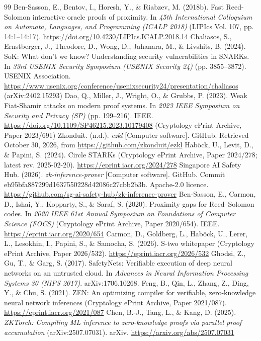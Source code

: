\documentclass[11pt]{article}
\begin{document}
\begin{thebibliography}{99}
 Ben-Sasson, E., Bentov, I., Horesh, Y., \& Riabzev, M. (2018b). Fast Reed-Solomon interactive oracle proofs of proximity. In \emph{45th International Colloquium on Automata, Languages, and Programming (ICALP 2018)} (LIPIcs Vol. 107, pp. 14:1--14:17). \url{https://doi.org/10.4230/LIPIcs.ICALP.2018.14}
 Chaliasos, S., Ernstberger, J., Theodore, D., Wong, D., Jahanara, M., \& Livshits, B. (2024). SoK: What don't we know? Understanding security vulnerabilities in SNARKs. In \emph{33rd USENIX Security Symposium (USENIX Security 24)} (pp. 3855--3872). USENIX Association. \url{https://www.usenix.org/conference/usenixsecurity24/presentation/chaliasos} (arXiv:2402.15293)
 Dao, Q., Miller, J., Wright, O., \& Grubbs, P. (2023). Weak Fiat-Shamir attacks on modern proof systems. In \emph{2023 IEEE Symposium on Security and Privacy (SP)} (pp. 199--216). IEEE. \url{https://doi.org/10.1109/SP46215.2023.10179408} (Cryptology ePrint Archive, Paper 2023/691)
 Zkonduit. (n.d.). \emph{ezkl} [Computer software]. GitHub. Retrieved October 30, 2026, from \url{https://github.com/zkonduit/ezkl}
 Hab\"{o}ck, U., Levit, D., \& Papini, S. (2024). Circle STARKs (Cryptology ePrint Archive, Paper 2024/278; latest rev. 2025-02-20). \url{https://eprint.iacr.org/2024/278}
 Singapore AI Safety Hub. (2026). \emph{zk-inference-prover} [Computer software]. GitHub. Commit eb95bfa887299d1637550228d42086c27cbb2b3b. Apache-2.0 licence. \url{https://github.com/sg-ai-safety-hub/zk-inference-prover}
 Ben-Sasson, E., Carmon, D., Ishai, Y., Kopparty, S., \& Saraf, S. (2020). Proximity gaps for Reed--Solomon codes. In \emph{2020 IEEE 61st Annual Symposium on Foundations of Computer Science (FOCS)} (Cryptology ePrint Archive, Paper 2020/654). IEEE. \url{https://eprint.iacr.org/2020/654}
 Carmon, D., Goldberg, L., Hab\"{o}ck, U., Lerer, L., Lesokhin, I., Papini, S., \& Samocha, S. (2026). S-two whitepaper (Cryptology ePrint Archive, Paper 2026/532). \url{https://eprint.iacr.org/2026/532}
 Ghodsi, Z., Gu, T., \& Garg, S. (2017). SafetyNets: Verifiable execution of deep neural networks on an untrusted cloud. In \emph{Advances in Neural Information Processing Systems 30 (NIPS 2017)}. arXiv:1706.10268.
 Feng, B., Qin, L., Zhang, Z., Ding, Y., \& Chu, S. (2021). ZEN: An optimizing compiler for verifiable, zero-knowledge neural network inferences (Cryptology ePrint Archive, Paper 2021/087). \url{https://eprint.iacr.org/2021/087}
 Chen, B.-J., Tang, L., \& Kang, D. (2025). \emph{ZKTorch: Compiling ML inference to zero-knowledge proofs via parallel proof accumulation} (arXiv:2507.07031). arXiv. \url{https://arxiv.org/abs/2507.07031}

\end{thebibliography}
\end{document}
